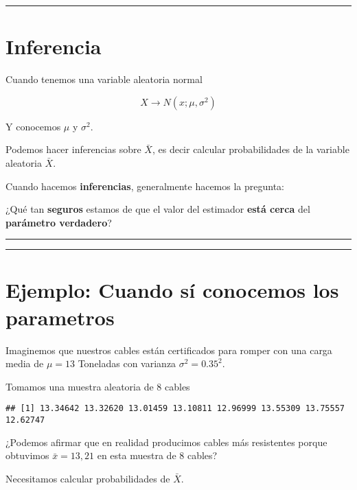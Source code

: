 \documentclass[
]{book}
\begin{document}
\begin{center}\rule{0.5\linewidth}{0.5pt}\end{center}

\hypertarget{inferencia}{%
\section{Inferencia}\label{inferencia}}

Cuando tenemos una variable aleatoria normal

\[X \rightarrow N(x; \mu, \sigma^2)\]

Y conocemos \(\mu\) y \(\sigma^2\).

Podemos hacer inferencias sobre \(\bar{X}\), es decir calcular probabilidades de la variable aleatoria \(\bar{X}\).

Cuando hacemos \textbf{inferencias}, generalmente hacemos la pregunta:

¿Qué tan \textbf{seguros} estamos de que el valor del estimador \textbf{está cerca} del \textbf{parámetro verdadero}?

\begin{center}\rule{0.5\linewidth}{0.5pt}\end{center}

\begin{center}\rule{0.5\linewidth}{0.5pt}\end{center}

\hypertarget{ejemplo-cuando-suxed-conocemos-los-parametros}{%
\section{Ejemplo: Cuando sí conocemos los parametros}\label{ejemplo-cuando-suxed-conocemos-los-parametros}}

Imaginemos que nuestros cables están certificados para romper con una carga media de \(\mu = 13\) Toneladas con varianza \(\sigma^2=0.35^2\).

Tomamos una muestra aleatoria de \(8\) cables

\begin{verbatim}
## [1] 13.34642 13.32620 13.01459 13.10811 12.96999 13.55309 13.75557 12.62747
\end{verbatim}

¿Podemos afirmar que en realidad producimos cables más resistentes porque obtuvimos \(\bar{x}=13,21\) en esta muestra de \(8\) cables?

Necesitamos calcular probabilidades de \(\bar{X}\).
\end{document}

